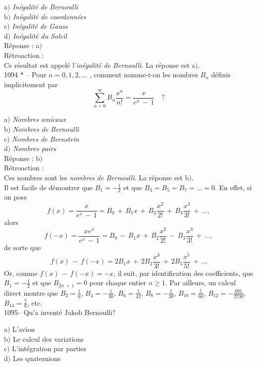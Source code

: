 ﻿\documentclass[letterpaper, 12pt]{article}
\begin{document}
a$)$ {\sl In\'egalit\'e de Bernoulli} \\
b$)$ {\sl In\'egalit\'e de coordonn\'ees}  \\
c$)$ {\sl In\'egalit\'e de Gauss}  \\
d$)$ {\sl In\'egalit\'e du Soleil}\\

R\'eponse : a$)$\\

R\'etroaction : \\
Ce r\'esultat est appel\'e l'{\sl in\'egalit\'e de Bernoulli}.
La r\'eponse est a$)$.\\

1094 * -- Pour $n=0,1,2,\ldots$ , comment nomme-t-on les nombres
$B_n$ d\'efinis implicitement par
$$\displaystyle{\sum_{n=0}^{\infty}B_n\frac{x^n}{n!}=\frac
x{e^x\,-\,1}}\quad ?$$

a$)$ {\sl Nombres amicaux} \\
b$)$ {\sl Nombres de Bernoulli}  \\
c$)$ {\sl Nombres de Bernstein}  \\
d$)$ {\sl Nombres pairs}\\

R\'eponse : b$)$\\

R\'etroaction : \\
Ces nombres sont les {\sl nombres de Bernoulli}. La r\'eponse est
b$)$. \\
Il est facile de d\'emontrer que $B_1=-\frac12$ et que
$B_3=B_5=B_7=\ldots=0$. En effet, si on pose
$$\displaystyle{f(x)=\frac
x{e^x\,-\,1}=B_0\,+\,B_1x\,+\,B_2\frac{x^2}{2!}\,+\,B_3\frac{x^3}{3!}\,+\,\ldots,}$$
alors
$$\displaystyle{f(-x)=\frac{xe^x}{e^x\,-\,1}=B_0\,-\,B_1x\,+\,B_2\frac{x^2}{2!}\,-\,B_3\frac{x^3}{3!}\,+\,\ldots,}$$
de sorte que
$$\displaystyle{f(x)\,-\,f(-x)=2B_1x\,+\,2B_3\frac{x^3}{3!}\,+\,2B_5\frac{x^5}{5!}\,+\,\ldots}$$
Or, comme $f(x)\,-\,f(-x)=-x$, il suit, par identification des
coefficients, que $B_1=-\frac12$ et que $B_{2n\,+\,1}=0$ pour chaque
entier $n\ge1$. Par ailleurs, un calcul direct montre que
$B_2=\frac16$, $B_4=-\frac1{30}$, $B_6=\frac1{42}$,
$B_8=-\frac1{30}$, $B_{10}=\frac5{66}$, $B_{12}=-\frac{691}{2730}$,
$B_{14}=\frac76$, etc.\\


1095-- Qu'a invent\'e Jakob Bernoulli?

a$)$ L'avion\\
b$)$ Le calcul des variations \\
c$)$ L'int\'egration par parties  \\
d$)$ Les quaternions  \\
\end{document}
